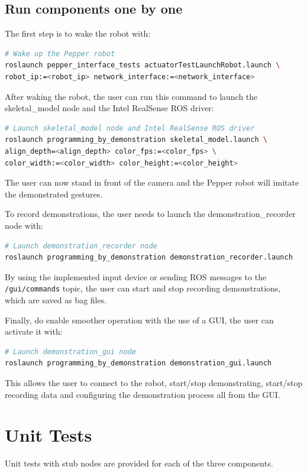 \documentclass{CSSRforAfrica}
\begin{document}
\subsection{Run components one by one} \label{sec:run_incremental}
The first step is to wake the robot with: 
\begin{lstlisting}[style=withoutNumbering, language=bash]
# Wake up the Pepper robot
roslaunch pepper_interface_tests actuatorTestLaunchRobot.launch \
robot_ip:=<robot_ip> network_interface:=<network_interface>
\end{lstlisting}

After waking the robot, the user can run this command to launch the skeletal\_model node and the Intel RealSense ROS driver:  
\begin{lstlisting}[style=withoutNumbering, language=bash]
# Launch skeletal_model node and Intel RealSense ROS driver
roslaunch programming_by_demonstration skeletal_model.launch \
align_depth=<align_depth> color_fps:=<color_fps> \
color_width:=<color_width> color_height:=<color_height> 
\end{lstlisting}
The user can now stand in front of the camera and the Pepper robot will imitate the demonstrated gestures. 

To record demonstrations, the user needs to launch the demonstration\_recorder node with: 
\begin{lstlisting}[style=withoutNumbering, language=bash]
# Launch demonstration_recorder node
roslaunch programming_by_demonstration demonstration_recorder.launch
\end{lstlisting}

By using the implemented input device or sending ROS messages to the \texttt{/gui/commands} topic, the user can start and stop recording demonstrations, which are saved as bag files. 

Finally, do enable smoother operation with the use of a GUI, the user can activate it with:
\begin{lstlisting}[style=withoutNumbering, language=bash]
# Launch demonstration_gui node
roslaunch programming_by_demonstration demonstration_gui.launch
\end{lstlisting}

This allows the user to connect to the robot, start/stop demonstrating, start/stop recording data and configuring the demonstration process all from the GUI. 





\newpage
\section{Unit Tests}
Unit tests with stub nodes are provided for each of the three components. 
\end{document}
